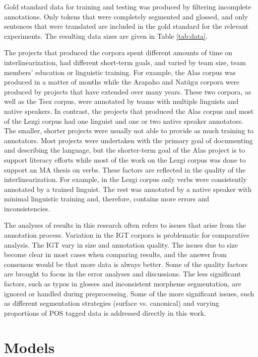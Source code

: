 Gold standard data for training and testing was produced by filtering incomplete annotations. Only tokens that were completely segmented and glossed, and only sentences that were translated are included in the gold standard for the relevant experiments. The resulting data sizes are given in Table \ref{tab:data}.

The projects that produced the corpora spent different amounts of time on interlinearization, had different short-term goals, and varied by team size, team members' education or linguistic training. For example, the Alas corpus was produced in a matter of months while the Arapaho and Natügu corpora were produced by projects that have extended over many years. These two corpora, as well as the Tsez corpus, were annotated by teams with multiple linguists and native speakers. In contrast, the projects that produced the Alas corpus and most of the Lezgi corpus had one linguist and one or two native speaker annotators. The smaller, shorter projects were usually not able to provide as much training to annotators. Most projects were undertaken with the primary goal of documenting and describing the language, but the shorter-term goal of the Alas project is to support literacy efforts while most of the work on the Lezgi corpus was done to support an MA thesis on verbs. These factors are reflected in the quality of the interlinearization. For example, in the Lezgi corpus only verbs were consistently annotated by a trained linguist. The rest was annotated by a native speaker with minimal linguistic training and, therefore, contains more errors and inconsistencies. 

The analyses of results in this research often refers to issues that arise from the annotation process. 
Variation in the IGT corpora is problematic for comparative analysis. The IGT vary in size and annotation quality. The issues due to size become clear in most cases when comparing results, and the answer from consensus would be that more data is always better. Some of the quality factors are brought to focus in the error analyses and discussions.
The less significant factors, such as typos in glosses and inconsistent morpheme segmentation, are ignored or handled during preprocessing. Some of the more significant issues, such as different segmentation strategies (surface vs. canonical) and varying proportions of POS tagged data is addressed directly in this work.


\section{Models}
\label{sec:models}

